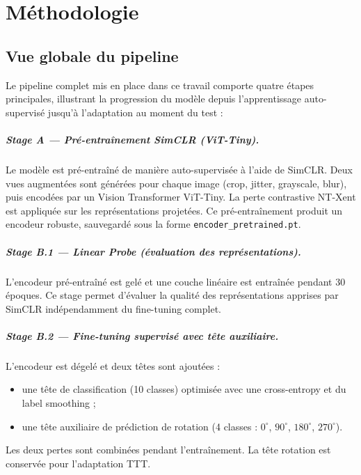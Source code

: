 \documentclass[12pt,a4paper]{report}
\begin{document}
	
	\chapter{Méthodologie}
	
	\section{Vue globale du pipeline}
	Le pipeline complet mis en place dans ce travail comporte quatre étapes principales, illustrant la progression du modèle depuis l’apprentissage auto-supervisé jusqu’à l’adaptation au moment du test :
	
	\paragraph{Stage A — Pré-entraînement SimCLR (ViT-Tiny).}
	Le modèle est pré-entraîné de manière auto-supervisée à l’aide de SimCLR.  
	Deux vues augmentées sont générées pour chaque image (crop, jitter, grayscale, blur), puis encodées par un Vision Transformer ViT-Tiny.  
	La perte contrastive NT-Xent est appliquée sur les représentations projetées.  
	Ce pré-entraînement produit un encodeur robuste, sauvegardé sous la forme \texttt{encoder\_pretrained.pt}.
	
	\paragraph{Stage B.1 — Linear Probe (évaluation des représentations).}
	L’encodeur pré-entraîné est gelé et une couche linéaire est entraînée pendant 30 époques.  
	Ce stage permet d’évaluer la qualité des représentations apprises par SimCLR indépendamment du fine-tuning complet.
	
	\paragraph{Stage B.2 — Fine-tuning supervisé avec tête auxiliaire.}
	L’encodeur est dégelé et deux têtes sont ajoutées :
	\begin{itemize}
		\item une tête de classification (10 classes) optimisée avec une cross-entropy et du label smoothing ;
		\item une tête auxiliaire de prédiction de rotation (4 classes : $0^\circ$, $90^\circ$, $180^\circ$, $270^\circ$).
	\end{itemize}
	Les deux pertes sont combinées pendant l’entraînement.  
	La tête rotation est conservée pour l’adaptation TTT.
	
\end{document}
